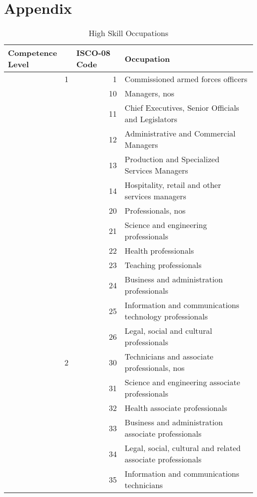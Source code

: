 \documentclass[]{article}
\begin{document}
\newpage

\appendix
\section{Appendix}
\begin{table}[H]
  \centering
  \caption{High Skill Occupations}
  \begin{tabular}{rrp{18em}}
    \toprule
    \multicolumn{1}{l}{Competence Level} & \multicolumn{1}{l}{ISCO-08 Code} & \multicolumn{1}{l}{Occupation} \\
    \midrule
    1     & 1     & Commissioned armed forces officers \\
                                         & 10    & Managers, nos \\
                                         & 11    & Chief Executives, Senior Officials and Legislators \\
                                         & 12    & Administrative and Commercial Managers \\
                                         & 13    & Production and Specialized Services Managers \\
                                         & 14    & Hospitality, retail and other services managers \\
                                         & 20    & Professionals, nos \\
                                         & 21    & Science and engineering professionals \\
                                         & 22    & Health professionals \\
                                         & 23    & Teaching professionals \\
                                         & 24    & Business and administration professionals \\
                                         & 25    & Information and communications technology professionals \\
                                         & 26    & Legal, social and cultural professionals \\
    \midrule
    2     & 30    & Technicians and associate professionals, nos \\
                                         & 31    & Science and engineering associate professionals \\
                                         & 32    & Health associate professionals \\
                                         & 33    & Business and administration associate professionals \\
                                         & 34    & Legal, social, cultural and related associate professionals \\
                                         & 35    & Information and communications technicians \\
    \bottomrule
  \end{tabular}%
  \label{tab:occupations_high}%
\end{table}%
\end{document}
